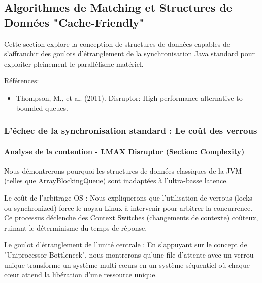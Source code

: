\subsection{Algorithmes de Matching et Structures de Données "Cache-Friendly"}

Cette section explore la conception de structures de données capables de s'affranchir des goulots d'étranglement de la synchronisation Java standard pour exploiter pleinement le parallélisme matériel.

Références:

\begin{itemize}
    \item Thompson, M., et al. (2011). Disruptor: High performance alternative to bounded queues.
\end{itemize}
\subsubsection{L'échec de la synchronisation standard : Le coût des verrous}

\paragraph{Analyse de la contention - LMAX Disruptor (Section: Complexity)}

Nous démontrerons pourquoi les structures de données classiques de la JVM (telles que ArrayBlockingQueue) sont inadaptées à l’ultra-basse latence.

Le coût de l'arbitrage OS : Nous expliquerons que l'utilisation de verrous (locks ou synchronized) force le noyau Linux à intervenir pour arbitrer la concurrence. Ce processus déclenche des Context Switches (changements de contexte) coûteux, ruinant le déterminisme du temps de réponse.

Le goulot d'étranglement de l'unité centrale : En s'appuyant sur le concept de "Uniprocessor Bottleneck", nous montrerons qu'une file d'attente avec un verrou unique transforme un système multi-cœurs en un système séquentiel où chaque cœur attend la libération d'une ressource unique.

